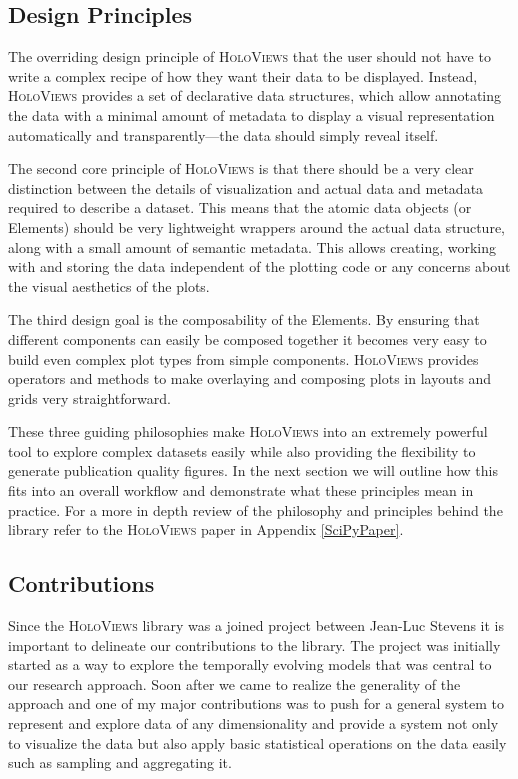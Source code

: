 \subsection{Design Principles}

The overriding design principle of \textsc{HoloViews} that the user
should not have to write a complex recipe of how they want their data
to be displayed.  Instead, \textsc{HoloViews} provides a set of
declarative data structures, which allow annotating the data with a
minimal amount of metadata to display a visual representation
automatically and transparently---the data should simply reveal
itself.

The second core principle of \textsc{HoloViews} is that there should
be a very clear distinction between the details of visualization and
actual data and metadata required to describe a dataset. This means
that the atomic data objects (or Elements) should be very lightweight
wrappers around the actual data structure, along with a small amount
of semantic metadata. This allows creating, working with and storing
the data independent of the plotting code or any concerns about the
visual aesthetics of the plots.

The third design goal is the composability of the Elements. By
ensuring that different components can easily be composed together it
becomes very easy to build even complex plot types from simple
components. \textsc{HoloViews} provides operators and methods to make
overlaying and composing plots in layouts and grids very
straightforward.

These three guiding philosophies make \textsc{HoloViews} into an
extremely powerful tool to explore complex datasets easily while also
providing the flexibility to generate publication quality figures. In
the next section we will outline how this fits into an overall
workflow and demonstrate what these principles mean in practice. For a
more in depth review of the philosophy and principles behind the
library refer to the \textsc{HoloViews} paper in Appendix
\ref{SciPyPaper}.

\subsection{Contributions}

Since the \textsc{HoloViews} library was a joined project between
Jean-Luc Stevens it is important to delineate our contributions to the
library. The project was initially started as a way to explore the
temporally evolving models that was central to our research
approach. Soon after we came to realize the generality of the approach
and one of my major contributions was to push for a general system to
represent and explore data of any dimensionality and provide a system
not only to visualize the data but also apply basic statistical
operations on the data easily such as sampling and aggregating it.

